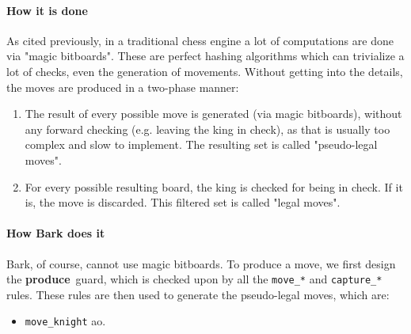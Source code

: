 \documentclass[a4paper, 10pt]{scrartcl}
\newcommand{\noderepr}[1]{\textsf{\textbf{#1}}}
\newcommand{\produce}{\noderepr{produce}}
\begin{document}
    \paragraph*{How it is done} As cited previously, in a traditional chess engine a lot of computations are done via "magic bitboards". These are perfect hashing algorithms which can trivialize a lot of checks, even the generation of movements. Without getting into the details, the moves are produced in a two-phase manner:
    \begin{enumerate}
        \item The result of every possible move is generated (via magic bitboards), without any forward checking (e.g. leaving the king in check), as that is usually too complex and slow to implement. The resulting set is called "pseudo-legal moves".
        \item For every possible resulting board, the king is checked for being in check. If it is, the move is discarded. This filtered set is called "legal moves".
    \end{enumerate}
    \paragraph*{How Bark does it} Bark, of course, cannot use magic bitboards. To produce a move, we first design the \produce\ guard, which is checked upon by all the \texttt{move\_*} and \texttt{capture\_*} rules. These rules are then used to generate the pseudo-legal moves, which are:
    \begin{itemize}
        \item \texttt{move\_knight} ao.
    \end{itemize}



\end{document}
